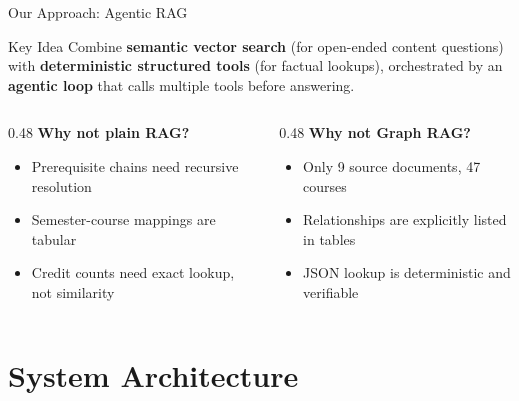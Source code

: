 \documentclass[aspectratio=169,10pt]{beamer}
\begin{document}
\begin{frame}{Our Approach: Agentic RAG}

\begin{block}{Key Idea}
Combine \textbf{semantic vector search} (for open-ended content questions) with \textbf{deterministic structured tools} (for factual lookups), orchestrated by an \textbf{agentic loop} that calls multiple tools before answering.
\end{block}

\vspace{0.5em}

\begin{columns}[T]
\begin{column}{0.48\textwidth}
\textbf{Why not plain RAG?}
\begin{itemize}
    \item Prerequisite chains need recursive resolution
    \item Semester-course mappings are tabular
    \item Credit counts need exact lookup, not similarity
\end{itemize}
\end{column}
\begin{column}{0.48\textwidth}
\textbf{Why not Graph RAG?}
\begin{itemize}
    \item Only 9 source documents, 47 courses
    \item Relationships are explicitly listed in tables
    \item JSON lookup is deterministic and verifiable
\end{itemize}
\end{column}
\end{columns}

\end{frame}


\section{System Architecture}
\end{document}
